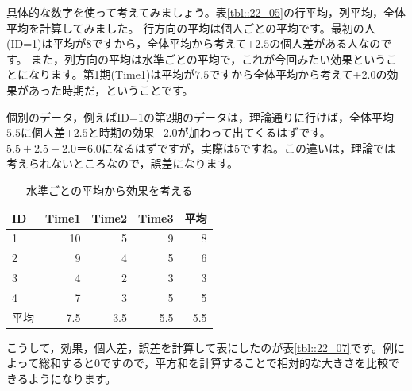 \documentclass{ltjbook}
\begin{document}
具体的な数字を使って考えてみましょう。表\ref{tbl::22_05}の行平均，列平均，全体平均を計算してみました。
行方向の平均は個人ごとの平均です。最初の人(ID=1)は平均が$8$ですから，全体平均から考えて$+2.5$の個人差がある人なのです。
また，列方向の平均は水準ごとの平均で，これが今回みたい効果ということになります。第1期(Time1)は平均が$7.5$ですから全体平均から考えて$+2.0$の効果があった時期だ，ということです。

個別のデータ，例えばID=1の第2期のデータは，理論通りに行けば，全体平均$5.5$に個人差$+2.5$と時期の効果$-2.0$が加わって出てくるはずです。$5.5+2.5-2.0＝6.0$になるはずですが，実際は$5$ですね。この違いは，理論では考えられないところなので，誤差になります。
\begin{table}[ht]
  \centering
  \caption{水準ごとの平均から効果を考える} 
  \begin{tabular}{lrrr|r}
    \hline
  ID & Time1 & Time2 & Time3 & 平均\\ 
    \hline
  1 & 10 & 5 & 9 & 8\\ 
    2 & 9 & 4 & 5 & 6\\ 
    3 & 4 & 2 & 3 & 3\\ 
    4 & 7 & 3 & 5 & 5\\ 
     \hline
平均 & 7.5 & 3.5 &  5.5 &  5.5 \\\hline
  \end{tabular}
  \label{tbl::22_06}
  \end{table}
こうして，効果，個人差，誤差を計算して表にしたのが表\ref{tbl::22_07}です。例によって総和すると0ですので，平方和を計算することで相対的な大きさを比較できるようになります。
\end{document}
